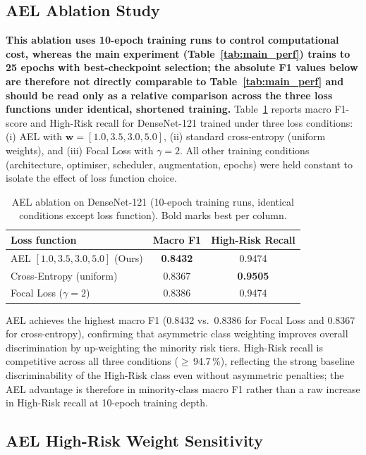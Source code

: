 \documentclass[11pt,a4paper]{article}
\begin{document}
\subsection{AEL Ablation Study}

\textbf{This ablation uses 10-epoch training runs to control computational
cost, whereas the main experiment (Table~\ref{tab:main_perf}) trains to 25
epochs with best-checkpoint selection; the absolute F1 values below are
therefore not directly comparable to Table~\ref{tab:main_perf} and should be
read only as a relative comparison across the three loss functions under
identical, shortened training.} Table~\ref{tab:ablation} reports macro
F1-score and High-Risk recall for DenseNet-121 trained under three loss
conditions: (i) AEL with
$\mathbf{w}=[1.0, 3.5, 3.0, 5.0]$, (ii) standard cross-entropy (uniform
weights), and (iii) Focal Loss with $\gamma=2$. All other training conditions
(architecture, optimiser, scheduler, augmentation, epochs) were held constant
to isolate the effect of loss function choice.

\begin{table}[H]
\centering
\caption{AEL ablation on DenseNet-121 (10-epoch training runs, identical
  conditions except loss function). Bold marks best per column.}
\label{tab:ablation}
\begin{tabular}{lcc}
\toprule
\textbf{Loss function} & \textbf{Macro F1} & \textbf{High-Risk Recall}\\
\midrule
AEL $[1.0, 3.5, 3.0, 5.0]$ (Ours) & \textbf{0.8432} & 0.9474\\
Cross-Entropy (uniform)              & 0.8367        & \textbf{0.9505}\\
Focal Loss ($\gamma=2$)              & 0.8386        & 0.9474\\
\bottomrule
\end{tabular}
\end{table}

AEL achieves the highest macro F1 (0.8432 vs.\ 0.8386 for Focal Loss and
0.8367 for cross-entropy), confirming that asymmetric class weighting
improves overall discrimination by up-weighting the minority risk tiers.
High-Risk recall is competitive across all three conditions
($\geq$\,94.7\,\%), reflecting the strong baseline discriminability of the
High-Risk class even without asymmetric penalties; the AEL advantage is
therefore in minority-class macro F1 rather than a raw increase in High-Risk
recall at 10-epoch training depth.

\subsection{AEL High-Risk Weight Sensitivity}
\label{sec:ael_sensitivity}
\end{document}
